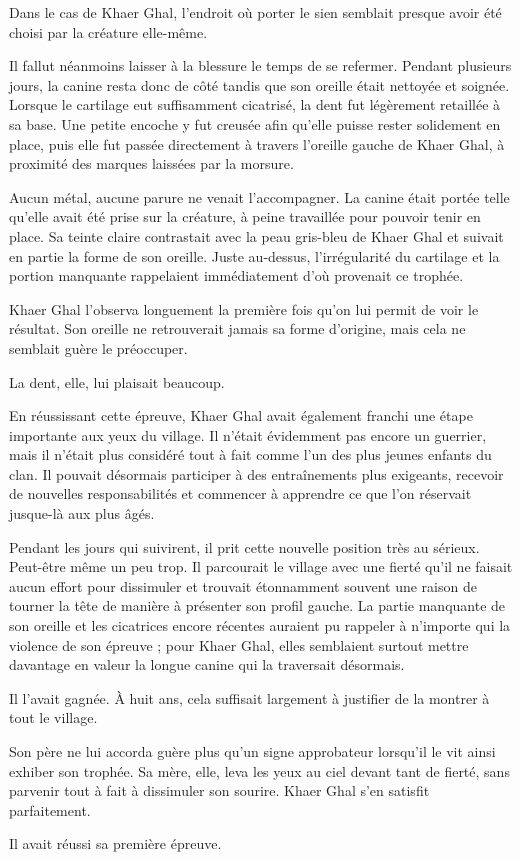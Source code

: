 Dans le cas de Khaer Ghal, l'endroit où porter le sien semblait presque avoir
été choisi par la créature elle-même.

Il fallut néanmoins laisser à la blessure le temps de se refermer. Pendant
plusieurs jours, la canine resta donc de côté tandis que son oreille était
nettoyée et soignée. Lorsque le cartilage eut suffisamment cicatrisé, la dent
fut légèrement retaillée à sa base. Une petite encoche y fut creusée afin
qu'elle puisse rester solidement en place, puis elle fut passée directement à
travers l'oreille gauche de Khaer Ghal, à proximité des marques laissées par la
morsure.

Aucun métal, aucune parure ne venait l'accompagner. La canine était portée
telle qu'elle avait été prise sur la créature, à peine travaillée pour pouvoir
tenir en place. Sa teinte claire contrastait avec la peau gris-bleu de Khaer
Ghal et suivait en partie la forme de son oreille. Juste au-dessus,
l'irrégularité du cartilage et la portion manquante rappelaient immédiatement
d'où provenait ce trophée.

Khaer Ghal l'observa longuement la première fois qu'on lui permit de voir le
résultat. Son oreille ne retrouverait jamais sa forme d'origine, mais cela ne
semblait guère le préoccuper.

La dent, elle, lui plaisait beaucoup.

\scenebreak

En réussissant cette épreuve, Khaer Ghal avait également franchi une étape
importante aux yeux du village. Il n'était évidemment pas encore un guerrier,
mais il n'était plus considéré tout à fait comme l'un des plus jeunes enfants
du clan. Il pouvait désormais participer à des entraînements plus exigeants,
recevoir de nouvelles responsabilités et commencer à apprendre ce que l'on
réservait jusque-là aux plus âgés.

Pendant les jours qui suivirent, il prit cette nouvelle position très au
sérieux. Peut-être même un peu trop. Il parcourait le village avec une fierté
qu'il ne faisait aucun effort pour dissimuler et trouvait étonnamment souvent
une raison de tourner la tête de manière à présenter son profil gauche. La
partie manquante de son oreille et les cicatrices encore récentes auraient pu
rappeler à n'importe qui la violence de son épreuve ; pour Khaer Ghal, elles
semblaient surtout mettre davantage en valeur la longue canine qui la
traversait désormais.

Il l'avait gagnée. À huit ans, cela suffisait largement à justifier de la
montrer à tout le village.

Son père ne lui accorda guère plus qu'un signe approbateur lorsqu'il le vit
ainsi exhiber son trophée. Sa mère, elle, leva les yeux au ciel devant tant de
fierté, sans parvenir tout à fait à dissimuler son sourire. Khaer Ghal s'en
satisfit parfaitement.

Il avait réussi sa première épreuve.